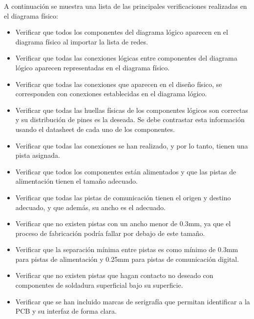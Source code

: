 A continuación se muestra una lista de las principales verificaciones realizadas en el diagrama físico:
\begin{itemize}
    \item Verificar que todos los componentes del diagrama lógico aparecen en el diagrama físico al importar la lista de redes.
    
    \item Verificar que todas las conexiones lógicas entre componentes del diagrama lógico aparecen representadas en el diagrama físico.
    
    \item Verificar que todas las conexiones que aparecen en el diseño físico, se corresponden con conexiones establecidas en el diagrama lógico.
    
    \item Verificar que todas las huellas físicas de los componentes lógicos son correctas y su distribución de pines es la deseada. Se debe contrastar esta información usando el datasheet de cada uno de los componentes.
    
    \item Verificar que todas las conexiones se han realizado, y por lo tanto, tienen una pista asignada.
    
    \item Verificar que todos los componentes están alimentados y que las pistas de alimentación tienen el tamaño adecuado.
    
    \item Verificar que todas las pistas de comunicación tienen el origen y destino adecuado, y que además, su ancho es el adecuado.
    
    \item Verificar que no existen pistas con un ancho menor de 0.3mm, ya que el proceso de fabricación podría fallar por debajo de este tamaño.
    
    \item Verificar que la separación mínima entre pistas es como mínimo de 0.3mm para pistas de alimentación y 0.25mm para pistas de comunicación digital.
    
    \item Verificar que no existen pistas que hagan contacto no deseado con componentes de soldadura superficial bajo su superficie.
    
    \item Verificar que se han incluido marcas de serigrafía que permitan identificar a la PCB y su interfaz de forma clara.
    

\end{itemize}

